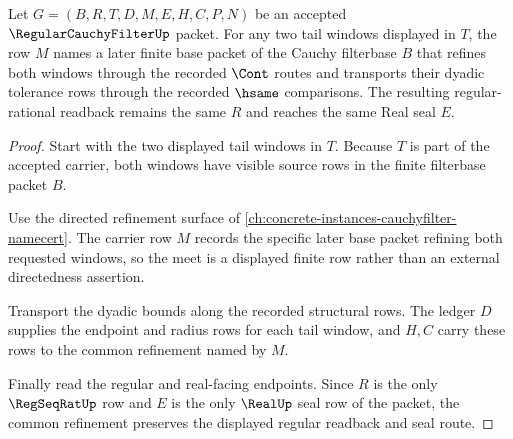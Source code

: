 \begin{theorem}
\label{thm:regular-cauchy-filter-tail-meet}
Let $G=(B,R,T,D,M,E,H,C,P,N)$ be an accepted $\RegularCauchyFilterUp$ packet. For any two tail windows displayed in $T$, the row $M$ names a later finite base packet of the Cauchy filterbase $B$ that refines both windows through the recorded $\Cont$ routes and transports their dyadic tolerance rows through the recorded $\hsame$ comparisons. The resulting regular-rational readback remains the same $R$ and reaches the same Real seal $E$.
\end{theorem}
\begin{proof}
Start with the two displayed tail windows in $T$. Because $T$ is part of the accepted carrier, both windows have visible source rows in the finite filterbase packet $B$.

Use the directed refinement surface of \autoref{ch:concrete-instances-cauchyfilter-namecert}. The carrier row $M$ records the specific later base packet refining both requested windows, so the meet is a displayed finite row rather than an external directedness assertion.

Transport the dyadic bounds along the recorded structural rows. The ledger $D$ supplies the endpoint and radius rows for each tail window, and $H,C$ carry these rows to the common refinement named by $M$.

Finally read the regular and real-facing endpoints. Since $R$ is the only $\RegSeqRatUp$ row and $E$ is the only $\RealUp$ seal row of the packet, the common refinement preserves the displayed regular readback and seal route.
\end{proof}

